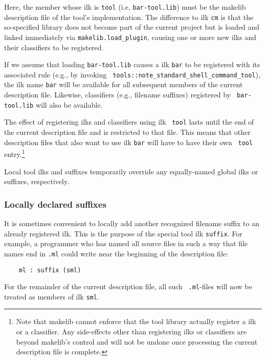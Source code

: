 Here, the member whose ilk is {\tt tool} (i.e, {\tt bar-tool.lib})
must be the makelib description file of the tool's implementation.  The
difference to ilk {\tt cm} is that the so-specified library does not
become part of the current project but is loaded and linked
immediately via {\tt makelib.load\_plugin}, causing one or more new ilks
and their classifiers to be registered.

If we assume that loading {\tt bar-tool.lib} causes a ilk {\tt bar}
to be registered with its associated rule (e.g., by invoking {\tt
tools::note_standard_shell_command_tool}), the ilk name {\tt bar} will be
available for all subsequent members of the current description file.
Likewise, classifiers (e.g., filename suffixes) registered by {\tt
bar-tool.lib} will also be available.

The effect of registering ilks and classifiers using ilk {\tt
tool} lasts until the end of the current description file and is
restricted to that file.  This means that other description files that
also want to use ilk {\tt bar} will have to have their own {\tt
tool} entry.\footnote{Note that makelib cannot enforce that the tool
library actually register a ilk or a classifier.  Any side-effects
other than registering ilks or classifiers are beyond makelib's control
and will not be undone once processing the current description file is
complete.}

Local tool ilks and suffixes temporarily override any equally-named
global ilks or suffixes, respectively.

\subsubsection{Locally declared suffixes}
\label{sec:localsuffixes}

It is sometimes convenient to locally add another recognized filename
suffix to an already registered ilk.  This is the purpose of the
special tool ilk {\tt suffix}.  For example, a programmer who has
named all source files in such a way that file names end in {\tt .ml}
could write near the beginning of the description file:

\begin{verbatim}
    ml : suffix (sml)
\end{verbatim}

For the remainder of the current description file, all such {\tt
.ml}-files will now be treated as members of ilk {\tt sml}.

